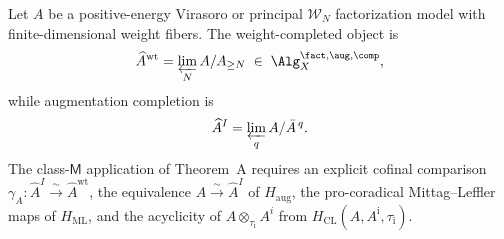 \begin{remark}
\label{rem:class-M-pro-conilpotent}
%
%
Let $A$ be a positive-energy Virasoro or principal $\mathcal W_N$
factorization model with finite-dimensional weight fibers.  The
weight-completed object is
\[
\widehat A^{\mathrm{wt}}=\varprojlim_N A/A_{\geq N}
 \;\in\; \Alg^{\fact,\aug,\comp}_X,
\]
while augmentation completion is
\[
\widehat A^{I}=\varprojlim_q A/\bar A^{\,q}.
\]
The class-$\mathsf M$ application of Theorem~A requires an explicit
cofinal comparison
$\gamma_A\colon\widehat A^{I}\xrightarrow{\sim}\widehat A^{\mathrm{wt}}$,
the equivalence $A\xrightarrow{\sim}\widehat A^{I}$ of
$H_{\mathrm{aug}}$, the pro-coradical Mittag--Leffler maps of
$H_{\mathrm{ML}}$, and the acyclicity of
$A\otimes_{\tau_{\mathrm i}}A^i$ from
$H_{\mathrm{CL}}(A,A^{\mathrm i},\tau_{\mathrm i})$.
\end{remark}

